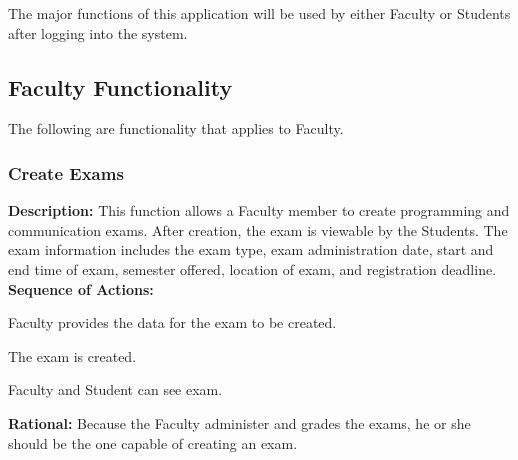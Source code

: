 

The major functions of this application will be used by either Faculty or Students
after logging into the system.

\subsection{Faculty Functionality}
The following are functionality that applies to Faculty.

   \subsubsection{\large Create Exams} 
   \begin{boxed} %
      \textbf{Description:}
      {\small This function allows a Faculty member to create programming and
         communication exams. After creation, the exam is viewable by the
         Students. The exam information includes the exam type, exam
         administration date, start and end time of exam, semester offered,
         location of exam, and registration deadline.} \\

      \textbf{Sequence of Actions:}
      \begin{enumerate}
            {\small
         \item Faculty provides the data for the exam to be created.
         \item The exam is created.
         \item Faculty and Student can see exam.}
      \end{enumerate}

      \textbf{Rational:}
      {\small Because the Faculty administer and grades the exams, he or she should
      be the one capable of creating an exam.}
   \end{boxed} %

